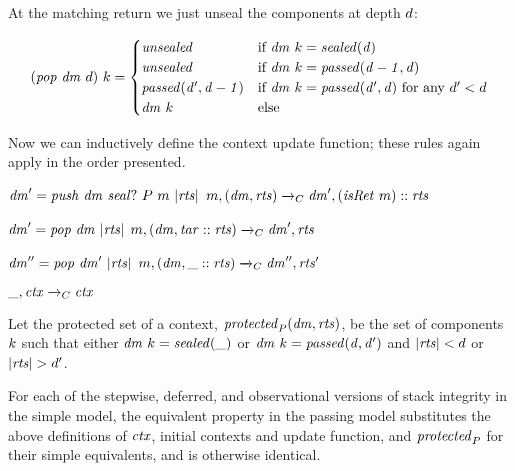 \documentclass[acmsmall,review,anonymous]{acmart}\settopmatter{printfolios=true,printccs=false,printacmref=false}
\begin{document}
{At the matching return we just unseal the components at depth \(d\):

\[(\mathit{pop} ~ \mathit{dm} ~ d) ~ k =
\begin{cases}
  \mathit{unsealed}                 & \text{if } \mathit{dm} ~ k = \mathit{sealed(d)} \\
  \mathit{unsealed}                 & \text{if } \mathit{dm} ~ k = \mathit{passed(d-1,d)} \\
  \mathit{passed(d',d-1)} & \text{if } \mathit{dm} ~ k = \mathit{passed(d',d)}
                              \text{ for any } d' < d \\
  \mathit{dm}~k        & \text{else} \\
\end{cases}\]

Now we can inductively define the context update function; these rules again apply in the order
presented. \ifspace{}\fi

            {\(\mathit{dm}' = \mathit{push} ~ \mathit{dm} ~ \mathit{seal?} ~ P ~ m ~ |\mathit{rts}|\)}
            {\(m,(\mathit{dm},\mathit{rts}) \xrightarrow{}_C \mathit{dm}',(\mathit{isRet} ~ m)::\mathit{rts}\)}

\vspace*{-1ex}
            {\(\mathit{dm}' = \mathit{pop} ~ \mathit{dm} ~ |\mathit{rts}|\)}
            {\(m,(\mathit{dm},\mathit{tar}::\mathit{rts}) \xrightarrow{}_C \mathit{dm}',\mathit{rts}\)}

\vspace*{-1ex}
              {\(\mathit{dm}'' = \mathit{pop} ~ \mathit{dm}' ~ |\mathit{rts}|\)}
              {\(m,(\mathit{dm},\mbox{\_}::\mathit{rts}) \xrightarrow{}_C \mathit{dm}'',\mathit{rts}'\)}

\vspace*{-3.5ex}
\judgment[ Default]
         {}
         {\(\mbox{\_},\mathit{ctx} \xrightarrow{}_C \mathit{ctx}\)}

 Let the protected set of a context, \(\mathit{protected}_P(\mathit{dm},\mathit{rts})\),
be the set of components \(k\) such that either \(\mathit{dm} ~ k = \mathit{sealed(\mbox{\_})}\)
or \(\mathit{dm} ~ k = \mathit{passed(d,d')}\) and \(|\mathit{rts}| < d\) or
\(|\mathit{rts}| > d'\).

For each of the stepwise, deferred, and observational versions of
stack integrity in the simple model, the equivalent property in the
passing model substitutes the above definitions of \(\mathit{ctx}\), initial contexts  and update
function, and \(\mathit{protected}_P\) for their simple equivalents, and is otherwise identical.

}
\end{document}
